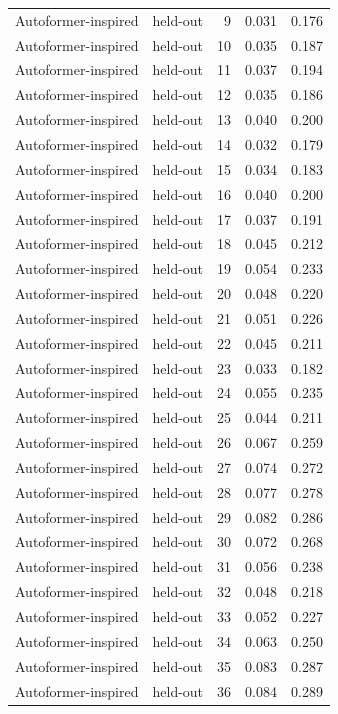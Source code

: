 \begin{tabular}{llrrr}
Autoformer-inspired & held-out & 9 & 0.031 & 0.176 \\
Autoformer-inspired & held-out & 10 & 0.035 & 0.187 \\
Autoformer-inspired & held-out & 11 & 0.037 & 0.194 \\
Autoformer-inspired & held-out & 12 & 0.035 & 0.186 \\
Autoformer-inspired & held-out & 13 & 0.040 & 0.200 \\
Autoformer-inspired & held-out & 14 & 0.032 & 0.179 \\
Autoformer-inspired & held-out & 15 & 0.034 & 0.183 \\
Autoformer-inspired & held-out & 16 & 0.040 & 0.200 \\
Autoformer-inspired & held-out & 17 & 0.037 & 0.191 \\
Autoformer-inspired & held-out & 18 & 0.045 & 0.212 \\
Autoformer-inspired & held-out & 19 & 0.054 & 0.233 \\
Autoformer-inspired & held-out & 20 & 0.048 & 0.220 \\
Autoformer-inspired & held-out & 21 & 0.051 & 0.226 \\
Autoformer-inspired & held-out & 22 & 0.045 & 0.211 \\
Autoformer-inspired & held-out & 23 & 0.033 & 0.182 \\
Autoformer-inspired & held-out & 24 & 0.055 & 0.235 \\
Autoformer-inspired & held-out & 25 & 0.044 & 0.211 \\
Autoformer-inspired & held-out & 26 & 0.067 & 0.259 \\
Autoformer-inspired & held-out & 27 & 0.074 & 0.272 \\
Autoformer-inspired & held-out & 28 & 0.077 & 0.278 \\
Autoformer-inspired & held-out & 29 & 0.082 & 0.286 \\
Autoformer-inspired & held-out & 30 & 0.072 & 0.268 \\
Autoformer-inspired & held-out & 31 & 0.056 & 0.238 \\
Autoformer-inspired & held-out & 32 & 0.048 & 0.218 \\
Autoformer-inspired & held-out & 33 & 0.052 & 0.227 \\
Autoformer-inspired & held-out & 34 & 0.063 & 0.250 \\
Autoformer-inspired & held-out & 35 & 0.083 & 0.287 \\
Autoformer-inspired & held-out & 36 & 0.084 & 0.289 \\

\end{tabular}
